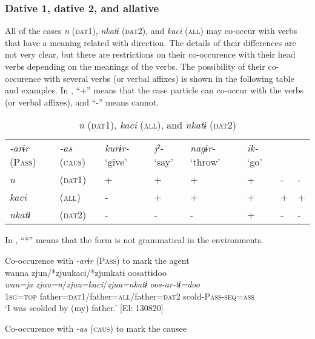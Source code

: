 \subsubsection{Dative 1, dative 2, and allative}

All of the cases \textit{n} (\textsc{dat}1), \textit{nkatɨ} (\textsc{dat2}), and \textit{kaci} (\textsc{all}) may co-occur with verbs that have a meaning related with direction. The details of their differences are not very clear, but there are restrictions on their co-occurence with their head verbs depending on the meanings of the verbs. The possibility of their co-occurence with several verbs (or verbal affixes) is shown in the following table and examples. In , “+” means that the case particle can co-occur with the verbs (or verbal affixes), and “-” means cannot.

\begin{table}
\caption{\label{tab:key:42} \textit{n} (\textsc{dat}1), \textit{kaci} (\textsc{all}), and \textit{nkatɨ} (\textsc{dat2})}
\begin{tabular}{llllllll}
\textit{-arɨr} (P\textsc{ass}) & \textit{-as} (\textsc{caus}) & \textit{kurɨr-} ‘give’  &\textit{jˀ-} ‘say’  &\textit{nagɨr-} ‘throw’ & \textit{ik-} ‘go’\\
\textit{n} &     (\textsc{dat}1) & + & + & + & + & - & -\\
\textit{kaci} &  (\textsc{all})  & - & + & + & + & + & +\\
\textit{nkatɨ} & (\textsc{dat}2) & - & - & - & + & - & -\\
\end{tabular}
\end{table}

In , “*” means that the form is not grammatical in the environments.

\ea\label{ex:6-82}
\ea Co-occurence with \textit{-arɨr} (P\textsc{ass}) to mark the agent\\
{\TM}
\glll wanna  zjun/*zjuukaci/*zjunkatɨ  oosattɨdoo\\
\textit{wan=ja}  \textit{zjuu=n}/\textit{zjuu=kaci}/\textit{zjuu=nkatɨ}  \textit{oos-ar-tɨ=doo}\\
    1\textsc{sg}=\textsc{top}  father=\textsc{dat}1/father=\textsc{all}/father=\textsc{dat2}  scold-P\textsc{ass}-\textsc{seq}=\textsc{ass}\\
\glt    ‘I was scolded by (my) father.’ [El: 130820]

\ex Co-occurence with \textit{-as} (\textsc{caus}) to mark the causee\\

